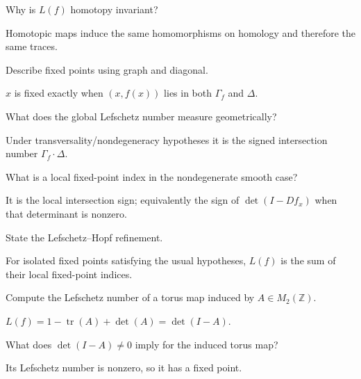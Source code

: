 \begin{problem}
Why is $L(f)$ homotopy invariant?
\end{problem}
\begin{solution}
Homotopic maps induce the same homomorphisms on homology and therefore the same traces.
\end{solution}

\begin{problem}
Describe fixed points using graph and diagonal.
\end{problem}
\begin{solution}
$x$ is fixed exactly when $(x,f(x))$ lies in both $\Gamma_f$ and $\Delta$.
\end{solution}

\begin{problem}
What does the global Lefschetz number measure geometrically?
\end{problem}
\begin{solution}
Under transversality/nondegeneracy hypotheses it is the signed intersection number $\Gamma_f\cdot\Delta$.
\end{solution}

\begin{problem}
What is a local fixed-point index in the nondegenerate smooth case?
\end{problem}
\begin{solution}
It is the local intersection sign; equivalently the sign of $\det(I-Df_x)$ when that determinant is nonzero.
\end{solution}

\begin{problem}
State the Lefschetz--Hopf refinement.
\end{problem}
\begin{solution}
For isolated fixed points satisfying the usual hypotheses, $L(f)$ is the sum of their local fixed-point indices.
\end{solution}

\begin{problem}
Compute the Lefschetz number of a torus map induced by $A\in M_2(\mathbb Z)$.
\end{problem}
\begin{solution}
$L(f)=1-\operatorname{tr}(A)+\det(A)=\det(I-A)$.
\end{solution}

\begin{problem}
What does $\det(I-A)\ne0$ imply for the induced torus map?
\end{problem}
\begin{solution}
Its Lefschetz number is nonzero, so it has a fixed point.
\end{solution}

